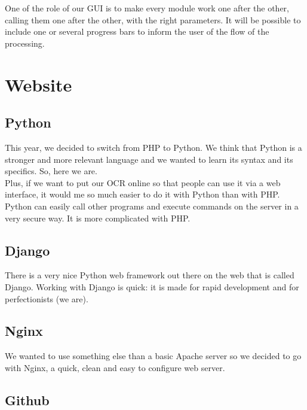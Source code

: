 \documentclass[12pt]{report}
\begin{document}
One of the role of our GUI is to make every module work one after the other, calling them one after the other, with the right parameters. It will be possible to include one or several progress bars to inform the user of the flow of the processing.

\chapter{Website}

\section{Python}

\begin{center}
\end{center}

This year, we decided to switch from PHP to Python. We think that Python is a
stronger and more relevant language and we wanted to learn its syntax and its
specifics. So, here we are. \\

Plus, if we want to put our OCR online so that people can use it via a web
interface, it would me so much easier to do it with Python than with PHP. Python
can easily call other programs and execute commands on the server in a very
secure way. It is more complicated with PHP.

\section{Django}

\begin{center}
\end{center}

There is a very nice Python web framework out there on the web that is called
Django. Working with Django is quick: it is made for rapid development and for
perfectionists (we are).

\section{Nginx}

\begin{center}
\end{center}

We wanted to use something else than a basic Apache server so we decided to go
with Nginx, a quick, clean and easy to configure web server.

\section{Github}
\end{document}
